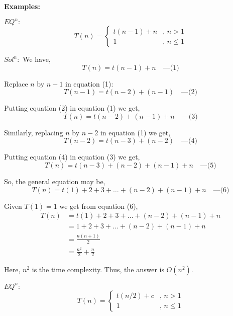 \documentclass{article}
\begin{document}
\textbf{Examples:}

$EQ^n:$
\[
    T(n) = 
    \begin{cases}
        t(n-1) + n & \text{, } n > 1 \\
        1 & \text{, } n \leq 1
    \end{cases}
\]

$Sol^n:$
We have,
\begin{equation}
    T(n) = t(n-1) + n \quad \text{---(1)}
\end{equation}

Replace \( n \) by \( n-1 \) in equation (1):
\begin{equation}
    T(n-1) = t(n-2) + (n-1) \quad \text{---(2)}
\end{equation}

Putting equation (2) in equation (1) we get,
\begin{equation}
    T(n) = t(n-2) + (n-1) + n \quad \text{---(3)}
\end{equation}

Similarly, replacing \( n \) by \( n-2 \) in equation (1) we get,
\begin{equation}
    T(n-2) = t(n-3) + (n-2) \quad \text{---(4)}
\end{equation}

Putting equation (4) in equation (3) we get,
\begin{equation}
    T(n) = t(n-3) + (n-2) + (n-1) + n \quad \text{---(5)}
\end{equation}

So, the general equation may be,
\begin{equation}
    T(n) = t(1) + 2 + 3 + \ldots + (n-2) + (n-1) + n \quad \text{---(6)}
\end{equation}

Given \( T(1) = 1 \) we get from  equation (6),
\begin{align*}
    T(n) & = t(1) + 2 + 3 + \ldots + (n-2) + (n-1) + n \\
         & = 1 + 2 + 3 + \ldots + (n-2) + (n-1) + n \\
         & = \frac{n(n+1)}{2} \\
         & = \frac{n^2}{2} + \frac{n}{2}
\end{align*}

Here, \( n^2 \) is the time complexity. Thus, the answer is \( O(n^2) \).

\hrulefill

\newpage

$EQ^n:$
\[
    T(n) = 
    \begin{cases}
        t(n/2) + c & \text{, } n > 1 \\
        1 & \text{, } n \leq 1
    \end{cases}
\]
\end{document}
